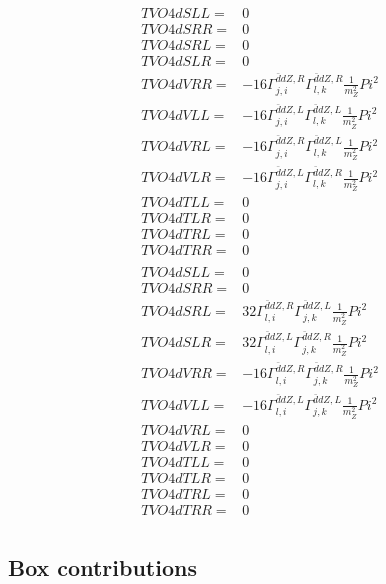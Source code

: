 \documentclass[A4,landscape]{article}
\begin{document}
\begin{align} 
  TVO4dSLL= & 0 \\ 
  TVO4dSRR= & 0 \\ 
  TVO4dSRL= & 0 \\ 
  TVO4dSLR= & 0 \\ 
  TVO4dVRR= & -16 \Gamma^{\bar{d}d Z ,R}_{j, i} \Gamma^{\bar{d}d Z ,R}_{l, k} \frac{1}{m^2_{Z}} Pi^2 \\ 
  TVO4dVLL= & -16 \Gamma^{\bar{d}d Z ,L}_{j, i} \Gamma^{\bar{d}d Z ,L}_{l, k} \frac{1}{m^2_{Z}} Pi^2 \\ 
  TVO4dVRL= & -16 \Gamma^{\bar{d}d Z ,R}_{j, i} \Gamma^{\bar{d}d Z ,L}_{l, k} \frac{1}{m^2_{Z}} Pi^2 \\ 
  TVO4dVLR= & -16 \Gamma^{\bar{d}d Z ,L}_{j, i} \Gamma^{\bar{d}d Z ,R}_{l, k} \frac{1}{m^2_{Z}} Pi^2 \\ 
  TVO4dTLL= & 0 \\ 
  TVO4dTLR= & 0 \\ 
  TVO4dTRL= & 0 \\ 
  TVO4dTRR= & 0 \\ 
\end{align} 
\begin{align} 
  TVO4dSLL= & 0 \\ 
  TVO4dSRR= & 0 \\ 
  TVO4dSRL= & 32 \Gamma^{\bar{d}d Z ,R}_{l, i} \Gamma^{\bar{d}d Z ,L}_{j, k} \frac{1}{m^2_{Z}} Pi^2 \\ 
  TVO4dSLR= & 32 \Gamma^{\bar{d}d Z ,L}_{l, i} \Gamma^{\bar{d}d Z ,R}_{j, k} \frac{1}{m^2_{Z}} Pi^2 \\ 
  TVO4dVRR= & -16 \Gamma^{\bar{d}d Z ,R}_{l, i} \Gamma^{\bar{d}d Z ,R}_{j, k} \frac{1}{m^2_{Z}} Pi^2 \\ 
  TVO4dVLL= & -16 \Gamma^{\bar{d}d Z ,L}_{l, i} \Gamma^{\bar{d}d Z ,L}_{j, k} \frac{1}{m^2_{Z}} Pi^2 \\ 
  TVO4dVRL= & 0 \\ 
  TVO4dVLR= & 0 \\ 
  TVO4dTLL= & 0 \\ 
  TVO4dTLR= & 0 \\ 
  TVO4dTRL= & 0 \\ 
  TVO4dTRR= & 0 \\ 
\end{align} 
\subsection{Box contributions} 
\end{document}
